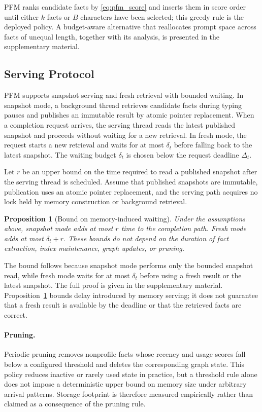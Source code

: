 \documentclass[letterpaper]{article} %
\newtheorem{proposition}{Proposition}
\begin{document}
PFM ranks candidate facts by \eqref{eq:pfm_score} and inserts them in score order until either $k$ facts or $B$ characters have been selected; this greedy rule is the deployed policy. A budget-aware alternative that reallocates prompt space across facts of unequal length, together with its analysis, is presented in the supplementary material.

\subsection{Serving Protocol}

PFM supports snapshot serving and fresh retrieval with bounded waiting. In snapshot mode, a background thread retrieves candidate facts during typing pauses and publishes an immutable result by atomic pointer replacement. When a completion request arrives, the serving thread reads the latest published snapshot and proceeds without waiting for a new retrieval. In fresh mode, the request starts a new retrieval and waits for at most $\delta_t$ before falling back to the latest snapshot. The waiting budget $\delta_t$ is chosen below the request deadline $\Delta_t$.

Let $r$ be an upper bound on the time required to read a published snapshot after the serving thread is scheduled. Assume that published snapshots are immutable, publication uses an atomic pointer replacement, and the serving path acquires no lock held by memory construction or background retrieval.

\begin{proposition}[Bound on memory-induced waiting]
\label{prop:waiting_bound}
Under the assumptions above, snapshot mode adds at most $r$ time to the completion path. Fresh mode adds at most $\delta_t+r$. These bounds do not depend on the duration of fact extraction, index maintenance, graph updates, or pruning.
\end{proposition}

The bound follows because snapshot mode performs only the bounded snapshot read, while fresh mode waits for at most $\delta_t$ before using a fresh result or the latest snapshot. The full proof is given in the supplementary material. Proposition~\ref{prop:waiting_bound} bounds delay introduced by memory serving; it does not guarantee that a fresh result is available by the deadline or that the retrieved facts are correct.

\paragraph{Pruning.} Periodic pruning removes nonprofile facts whose recency and usage scores fall below a configured threshold and deletes the corresponding graph state. This policy reduces inactive or rarely used state in practice, but a threshold rule alone does not impose a deterministic upper bound on memory size under arbitrary arrival patterns. Storage footprint is therefore measured empirically rather than claimed as a consequence of the pruning rule.
\end{document}
